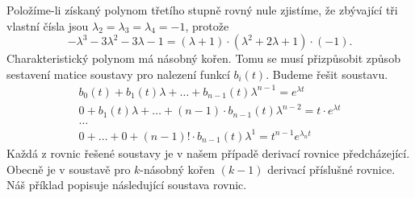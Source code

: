 Položíme-li získaný polynom třetího stupně rovný nule zjistíme, že zbývající tři vlastní čísla jsou $\lambda_2 = \lambda_3 = \lambda_4 = -1$, protože 
\[
 -\lambda^3 - 3\lambda^2 - 3\lambda -1 = (\lambda + 1)\cdot(\lambda^2 + 2\lambda + 1)\cdot(-1).
\]
Charakteristický polynom má násobný kořen. Tomu se musí přizpůsobit způsob sestavení matice soustavy pro nalezení funkcí $b_i(t)$. Budeme řešit soustavu.
\begin{equation*}
    \begin{array}{c}
      b_0(t) + b_1(t)\lambda + \ldots + b_{n-1}(t) \lambda^{n-1} = e^{\lambda t}\\
      0 + b_1(t)\lambda + \ldots + (n-1)\cdot b_{n-1}(t) \lambda^{n-2} = t\cdot e^{\lambda t}\\
      \ldots\\        
      0 + \ldots  + 0 + (n-1)!\cdot b_{n-1}(t) \lambda^{1} = t^{n-1}e^{\lambda_n t}
    \end{array}
\end{equation*}
Každá z rovnic řešené soustavy je v našem případě derivací rovnice předcházející. Obecně je v soustavě pro $k$-násobný kořen $(k-1)$ derivací příslušné rovnice.\newline
Náš příklad popisuje následující soustava rovnic.
